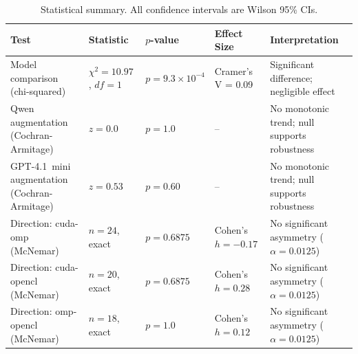 \begin{table}[htbp]
\centering
\caption{Statistical summary. All confidence intervals are Wilson 95\% CIs.}
\label{tab:stats-summary}
\small
\begin{tabular}{@{}lllll@{}}
\toprule
Test & Statistic & $p$-value & Effect Size & Interpretation \\
\midrule
Model comparison (chi-squared) & $\chi^2 = 10.97$, $df=1$ & $p = 9.3 \times 10^{-4}$ & Cramer's V = 0.09 & Significant difference; negligible effect \\ %
Qwen augmentation (Cochran-Armitage) & $z = 0.0$ & $p = 1.0$ & -- & No monotonic trend; null supports robustness \\ %
GPT-4.1~mini augmentation (Cochran-Armitage) & $z = 0.53$ & $p = 0.60$ & -- & No monotonic trend; null supports robustness \\ %
Direction: cuda-omp (McNemar) & $n=24$, exact & $p = 0.6875$ & Cohen's $h = -0.17$ & No significant asymmetry ($\alpha=0.0125$) \\ %
Direction: cuda-opencl (McNemar) & $n=20$, exact & $p = 0.6875$ & Cohen's $h = 0.28$ & No significant asymmetry ($\alpha=0.0125$) \\ %
Direction: omp-opencl (McNemar) & $n=18$, exact & $p = 1.0$ & Cohen's $h = 0.12$ & No significant asymmetry ($\alpha=0.0125$) \\ %
\bottomrule
\end{tabular}
\end{table}



